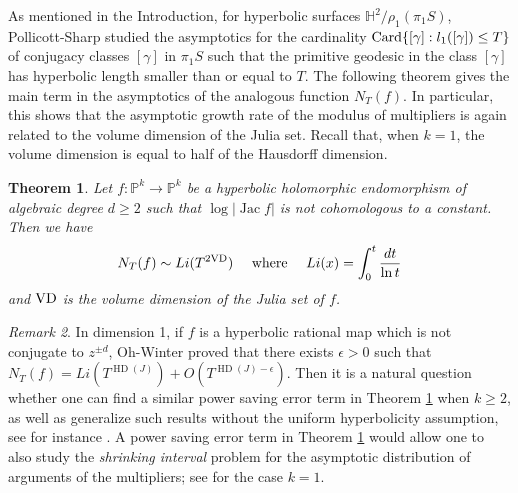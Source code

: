 \documentclass[11pt]{amsart}
\theoremstyle{plain}
\newtheorem{thm}{Theorem}[section]
\theoremstyle{definition}
\theoremstyle{remark}
\newtheorem{rmk}[thm]{Remark}
\DeclareMathOperator{\HD}{HD}
\DeclareMathOperator{\Jac}{Jac}
\begin{document}
As mentioned in the Introduction, for hyperbolic surfaces $\mathbb{H}^2/\rho_1(\pi_1S)$, Pollicott-Sharp \cite{PS98} studied the asymptotics for the cardinality ${\rm Card} \{[\gamma] : l_1([\gamma]) \le T \}$ of conjugacy classes $[\gamma]$ in $\pi_1S$ such that the primitive geodesic in the class $[\gamma]$ has hyperbolic length smaller than or equal to $T$. 
The following theorem gives the main term in the asymptotics 
of the analogous function
$N_T(f)$.
In particular, this shows that the asymptotic growth rate of the modulus of multipliers is again
related to
the volume dimension
of the Julia set. Recall that, when $k=1$, the volume dimension is equal to half 
of the Hausdorff dimension.

\begin{thm}\label{thm_higher}
Let $f \colon \mathbb{P}^k \to \mathbb{P}^k$ be a hyperbolic holomorphic endomorphism of algebraic degree $d \ge 2$ such that $\log |\Jac f|$ is not cohomologous to a constant. Then we have
\[N_T(f) \sim Li(T^{\rm 2VD})
\quad \mbox{ where }
\quad
Li(x) = \int_0^t \frac{dt}{\ln t}\] 
and ${\rm VD}$ is the volume dimension of the Julia set of $f$.
\end{thm}

\begin{rmk}
In dimension 1, if $f$ is a hyperbolic rational map which is not conjugate to $z^{\pm d}$, Oh-Winter \cite{Oh17} proved that there exists $\epsilon>0$ such that
$N_T(f) = Li(T^{\HD (J)})+O(T^{\HD(J)-\epsilon})$. Then
 it is a natural question
whether one can find a similar power saving error term in Theorem \ref{thm_higher} when $k\ge2$, as well as
generalize such results 
without the uniform hyperbolicity assumption, see for instance 
\cite{LRL}. 
A power saving error term in Theorem \ref{thm_higher} would allow one to also
study the {\it shrinking interval} problem for the asymptotic distribution of arguments of the multipliers; see \cite{HeNie22} for the case $k=1$.
\end{rmk}
\end{document}
